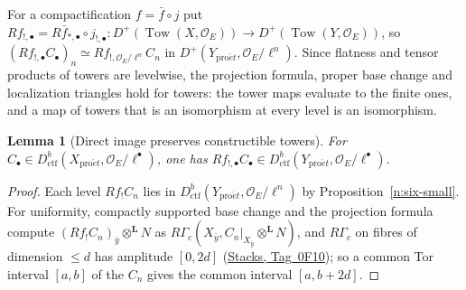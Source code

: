 \documentclass[11pt,a4paper]{article}
\numberwithin{equation}{section}
\newtheorem{lemma}[theorem]{Lemma}
\theoremstyle{definition}
\theoremstyle{remark}
\newcommand{\proet}{\mathrm{pro}\acute{e}t}
\newcommand{\stacks}[1]{\href{https://stacks.math.columbia.edu/tag/#1}{\textnormal{Stacks, Tag~#1}}}
\newcommand{\Dctf}{D^b_{\mathrm{ctf}}}
\begin{document}
For a compactification $f=\bar f\circ j$ put
$Rf_{!,\bullet}=R\bar f_{*,\bullet}\circ j_{!,\bullet}\colon
D^+(\operatorname{Tow}(X,\mathcal O_E))\to D^+(\operatorname{Tow}(Y,\mathcal O_E))$, so
$(Rf_{!,\bullet}C_\bullet)_n\simeq Rf_{!,\mathcal O_E/\ell^n}C_n$ in
$D^+(Y_{\proet},\mathcal O_E/\ell^n)$. Since
flatness and tensor products of towers are levelwise, the projection
formula, proper base change and localization triangles hold for towers:
the tower maps evaluate to the finite ones, and a map of towers that is
an isomorphism at every level is an isomorphism.

\begin{lemma}[Direct image preserves constructible towers]
\label{lem:sp-tower-bound}
For $C_\bullet\in\Dctf(X_{\proet},\mathcal O_E/\ell^\bullet)$, one has
$Rf_{!,\bullet}C_\bullet\in\Dctf(Y_{\proet},\mathcal O_E/\ell^\bullet)$.
\end{lemma}
\begin{proof}
Each level $Rf_{!}C_n$ lies in $\Dctf(Y_{\proet},\mathcal O_E/\ell^n)$
by Proposition~\ref{n:six-small}.
For uniformity, compactly supported base change and the projection
formula compute
$(Rf_{!}C_n)_{\bar y}\otimes^{\mathbf L}N$ as
$R\Gamma_c(X_{\bar y},C_n|_{X_{\bar y}}\otimes^{\mathbf L}N)$, and
$R\Gamma_c$ on fibres of dimension $\leq d$ has amplitude $[0,2d]$
(\stacks{0F10}); so a common Tor interval $[a,b]$ of the $C_n$ gives
the common interval $[a,b+2d]$.
\end{proof}
\end{document}
